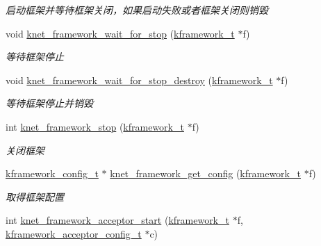 \begin{DoxyCompactItemize}
\begin{DoxyCompactList}\small\item\em 启动框架并等待框架关闭，如果启动失败或者框架关闭则销毁 \end{DoxyCompactList}\item 
void \hyperlink{a00106_gacff434cca9ce60fa5a3597348ee4360b_gacff434cca9ce60fa5a3597348ee4360b}{knet\+\_\+framework\+\_\+wait\+\_\+for\+\_\+stop} (\hyperlink{a00053_a3195a3be35782fc1efb920c811be111d_a3195a3be35782fc1efb920c811be111d}{kframework\+\_\+t} $\ast$f)
\begin{DoxyCompactList}\small\item\em 等待框架停止 \end{DoxyCompactList}\item 
void \hyperlink{a00106_ga5936d2ece03511c366b19bc7616ac8be_ga5936d2ece03511c366b19bc7616ac8be}{knet\+\_\+framework\+\_\+wait\+\_\+for\+\_\+stop\+\_\+destroy} (\hyperlink{a00053_a3195a3be35782fc1efb920c811be111d_a3195a3be35782fc1efb920c811be111d}{kframework\+\_\+t} $\ast$f)
\begin{DoxyCompactList}\small\item\em 等待框架停止并销毁 \end{DoxyCompactList}\item 
int \hyperlink{a00106_gac8f76fe72392bc5103b70fb5b3280839_gac8f76fe72392bc5103b70fb5b3280839}{knet\+\_\+framework\+\_\+stop} (\hyperlink{a00053_a3195a3be35782fc1efb920c811be111d_a3195a3be35782fc1efb920c811be111d}{kframework\+\_\+t} $\ast$f)
\begin{DoxyCompactList}\small\item\em 关闭框架 \end{DoxyCompactList}\item 
\hyperlink{a00053_adeaf952e0f0887507ff836385bf54874_adeaf952e0f0887507ff836385bf54874}{kframework\+\_\+config\+\_\+t} $\ast$ \hyperlink{a00106_ga2fcd8c172557a78fe7edbba0e7f9da40_ga2fcd8c172557a78fe7edbba0e7f9da40}{knet\+\_\+framework\+\_\+get\+\_\+config} (\hyperlink{a00053_a3195a3be35782fc1efb920c811be111d_a3195a3be35782fc1efb920c811be111d}{kframework\+\_\+t} $\ast$f)
\begin{DoxyCompactList}\small\item\em 取得框架配置 \end{DoxyCompactList}\item 
int \hyperlink{a00106_gae3f68614153df18fabd1c7d148ce826b_gae3f68614153df18fabd1c7d148ce826b}{knet\+\_\+framework\+\_\+acceptor\+\_\+start} (\hyperlink{a00053_a3195a3be35782fc1efb920c811be111d_a3195a3be35782fc1efb920c811be111d}{kframework\+\_\+t} $\ast$f, \hyperlink{a00053_a39c993eb450173e4fde04498d757f9b6_a39c993eb450173e4fde04498d757f9b6}{kframework\+\_\+acceptor\+\_\+config\+\_\+t} $\ast$c)

\end{DoxyCompactItemize}
